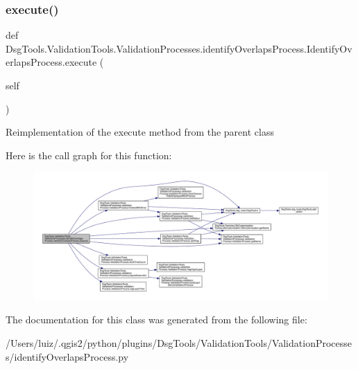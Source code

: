 \subsubsection{\texorpdfstring{execute()}{execute()}}
{\footnotesize\ttfamily def Dsg\+Tools.\+Validation\+Tools.\+Validation\+Processes.\+identify\+Overlaps\+Process.\+Identify\+Overlaps\+Process.\+execute (\begin{DoxyParamCaption}\item[{}]{self }\end{DoxyParamCaption})}

\begin{DoxyVerb}Reimplementation of the execute method from the parent class
\end{DoxyVerb}
 Here is the call graph for this function\+:
\nopagebreak
\begin{figure}[H]
\begin{center}
\leavevmode
\includegraphics[width=350pt]{class_dsg_tools_1_1_validation_tools_1_1_validation_processes_1_1identify_overlaps_process_1_1_identify_overlaps_process_a69456bac9b693988550669bd20cd32de_cgraph}
\end{center}
\end{figure}


The documentation for this class was generated from the following file\+:\begin{DoxyCompactItemize}
\item 
/\+Users/luiz/.\+qgis2/python/plugins/\+Dsg\+Tools/\+Validation\+Tools/\+Validation\+Processes/identify\+Overlaps\+Process.\+py\end{DoxyCompactItemize}
